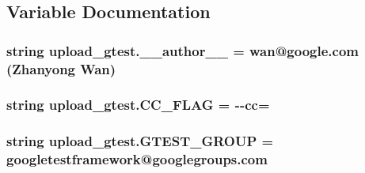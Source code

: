 \subsection{Variable Documentation}
\hypertarget{namespaceupload__gtest_ae7f6ee6ec8f85faa6fb72465afce7c0d}{}
\subsubsection[{\+\_\+\+\_\+author\+\_\+\+\_\+}]{\setlength{\rightskip}{0pt plus 5cm}string upload\+\_\+gtest.\+\_\+\+\_\+author\+\_\+\+\_\+ = \textquotesingle{}wan@google.\+com (Zhanyong Wan)\textquotesingle{}}\label{namespaceupload__gtest_ae7f6ee6ec8f85faa6fb72465afce7c0d}
\hypertarget{namespaceupload__gtest_a83f0946f9ee3731253fc622acd581fc2}{}
\subsubsection[{C\+C\+\_\+\+F\+L\+A\+G}]{\setlength{\rightskip}{0pt plus 5cm}string upload\+\_\+gtest.\+C\+C\+\_\+\+F\+L\+A\+G = \textquotesingle{}-\/-\/cc=\textquotesingle{}}\label{namespaceupload__gtest_a83f0946f9ee3731253fc622acd581fc2}
\hypertarget{namespaceupload__gtest_af282f4c60bf6069ed0abf4e06d9b70ab}{}
\subsubsection[{G\+T\+E\+S\+T\+\_\+\+G\+R\+O\+U\+P}]{\setlength{\rightskip}{0pt plus 5cm}string upload\+\_\+gtest.\+G\+T\+E\+S\+T\+\_\+\+G\+R\+O\+U\+P = \textquotesingle{}googletestframework@googlegroups.\+com\textquotesingle{}}\label{namespaceupload__gtest_af282f4c60bf6069ed0abf4e06d9b70ab}
